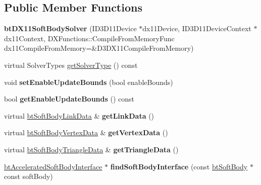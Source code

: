 \subsection*{Public Member Functions}
\begin{DoxyCompactItemize}
\item 
\mbox{\label{classbtDX11SoftBodySolver_a252664ab4df3d33392675e25f2499811}} 
{\bfseries bt\+D\+X11\+Soft\+Body\+Solver} (I\+D3\+D11\+Device $\ast$dx11\+Device, I\+D3\+D11\+Device\+Context $\ast$dx11\+Context, D\+X\+Functions\+::\+Compile\+From\+Memory\+Func dx11\+Compile\+From\+Memory=\&D3\+D\+X11\+Compile\+From\+Memory)
\item 
virtual Solver\+Types \hyperlink{classbtDX11SoftBodySolver_a1142bb4f735d275f161f003f7d703768}{get\+Solver\+Type} () const
\item 
\mbox{\label{classbtDX11SoftBodySolver_ad84c9f5da1e1971c11882dd91f4d0f2b}} 
void {\bfseries set\+Enable\+Update\+Bounds} (bool enable\+Bounds)
\item 
\mbox{\label{classbtDX11SoftBodySolver_aae5b1c4c04b70b0e87c029905f115959}} 
bool {\bfseries get\+Enable\+Update\+Bounds} () const
\item 
\mbox{\label{classbtDX11SoftBodySolver_ad4b1641c8506046e28f13a404a004314}} 
virtual \hyperlink{classbtSoftBodyLinkData}{bt\+Soft\+Body\+Link\+Data} \& {\bfseries get\+Link\+Data} ()
\item 
\mbox{\label{classbtDX11SoftBodySolver_a8fa697c8f3c040b2df1afd35b903efa1}} 
virtual \hyperlink{classbtSoftBodyVertexData}{bt\+Soft\+Body\+Vertex\+Data} \& {\bfseries get\+Vertex\+Data} ()
\item 
\mbox{\label{classbtDX11SoftBodySolver_a3bf966f69827fec447bcb2577f66eb1c}} 
virtual \hyperlink{classbtSoftBodyTriangleData}{bt\+Soft\+Body\+Triangle\+Data} \& {\bfseries get\+Triangle\+Data} ()
\item 
\mbox{\label{classbtDX11SoftBodySolver_a7d1e59a8d3a1326415a179cd77720019}} 
\hyperlink{classbtDX11SoftBodySolver_1_1btAcceleratedSoftBodyInterface}{bt\+Accelerated\+Soft\+Body\+Interface} $\ast$ {\bfseries find\+Soft\+Body\+Interface} (const \hyperlink{classbtSoftBody}{bt\+Soft\+Body} $\ast$const soft\+Body)

\end{DoxyCompactItemize}
